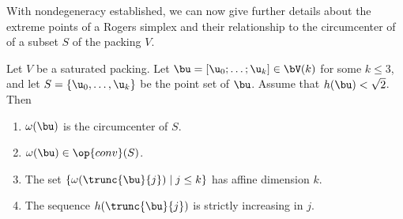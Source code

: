 With nondegeneracy established, we can now give further details about
the extreme points of a Rogers simplex and their relationship to the
circumcenter of of a subset $S$ of the packing $V$.

\begin{lemma}\label{lemma:v2} 
Let $V$ be a saturated packing.
Let $\bu=[\u_0;\ldots;\u_k]\in \bV(k)$ for some $k\le 3$,
and let $S=\{\u_0,\ldots,\u_k\}$ be the
point set of $\bu$.
Assume that $h(\bu)<\sqrt2$.
Then 
\begin{enumerate} 
\item%
$\omega(\bu)$ is the circumcenter of $S$.
\item%
$\omega(\bu)\in\op{conv}(S)$.
\item%
The set $\{\omega(\trunc{\bu}{j})\mid j\le k\}$ has affine dimension $k$.
\item
The sequence $h(\trunc{\bu}{j})$ is
strictly increasing in $j$.
\end{enumerate}
\end{lemma}
%

